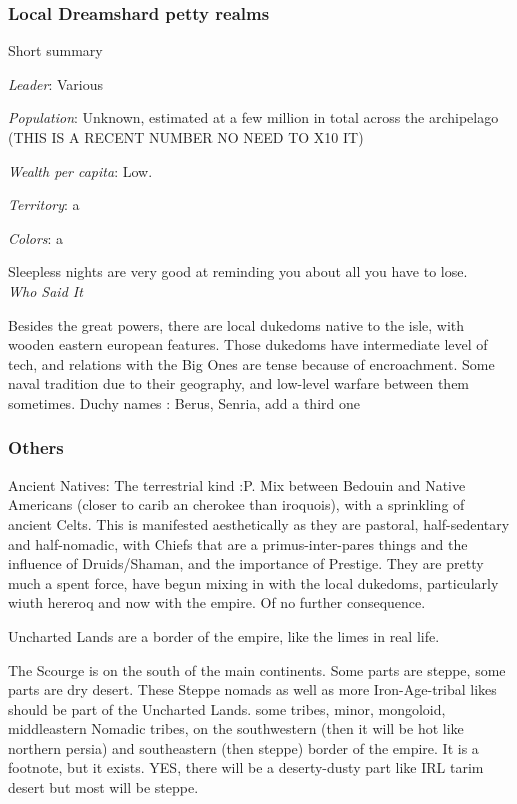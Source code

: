 \subsubsection{Local Dreamshard petty realms}


Short summary

\textit{Leader}: Various

\textit{Population}: Unknown, estimated at a few million in total across the archipelago (THIS IS A RECENT NUMBER NO NEED TO X10 IT)

\textit{Wealth per capita}: Low.

\textit{Territory}: a
    
\textit{Colors}: a

\begin{rpg-quotebox}
    Sleepless nights are very good at reminding you about all you have to lose. \\ \textendash \textit{Who Said It}
\end{rpg-quotebox}

Besides the great powers, there are local dukedoms native to the isle, with wooden eastern european features. Those dukedoms have intermediate level of tech, and relations with the Big Ones are tense because of encroachment. Some naval tradition due to their geography, and low-level warfare between them sometimes.
	Duchy names : Berus, Senria, add a third one

\subsubsection{Others}



Ancient Natives: The terrestrial kind :P. Mix between Bedouin and Native Americans (closer to carib an cherokee than iroquois), with a sprinkling of ancient Celts. This is manifested aesthetically as they are pastoral, half-sedentary and half-nomadic, with Chiefs that are a primus-inter-pares things and the influence of Druids/Shaman, and the importance of Prestige. They are pretty much a spent force, have begun mixing in with the local dukedoms, particularly wiuth hereroq and now with the empire. Of no further consequence.

Uncharted Lands are a border of the empire, like the limes in real life.

The Scourge is on the south of the main continents. Some parts are steppe, some parts are dry desert. These Steppe nomads as well as more Iron-Age-tribal likes should be part of the Uncharted Lands. some tribes, minor, mongoloid, middleastern
Nomadic tribes, on the southwestern (then it will be hot like northern persia) and southeastern (then steppe) border of the empire. It is a footnote, but it exists. YES, there will be a deserty-dusty part like IRL tarim desert but most will be steppe.







